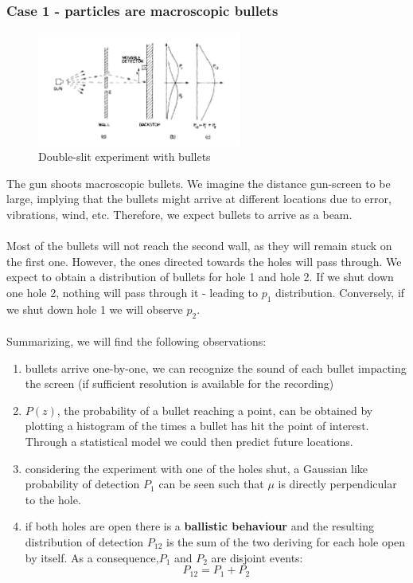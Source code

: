   \subsubsection{Case 1 - particles are macroscopic bullets}
  \begin{figure}[h!]
    \centering
    \includegraphics[clip, width=0.6\textwidth]{gun_ds.png}
    \caption{\label{fig:gun_ds} Double-slit experiment with bullets}
\end{figure}
  \noindent
  The gun shoots macroscopic bullets. We imagine the distance gun-screen to be large, implying that the bullets might arrive at different locations due to error, vibrations, wind, etc. Therefore, we expect bullets to arrive as a beam.\\
  \\
\noindent
  Most of the bullets will not reach the second wall, as they will remain stuck on the first one. However, the ones directed towards the holes will pass through. We expect to obtain a distribution of bullets for hole 1 and hole 2. If we shut down one hole 2, nothing will pass through it - leading to $p_1$ distribution. Conversely, if we shut down hole 1 we will observe $p_2$.\\
  \\
 \noindent
Summarizing, we will find the following observations:
\begin{enumerate}
    \item bullets arrive one-by-one, we can recognize the sound of each bullet impacting the screen (if sufficient resolution is available for the recording)
    \item $P(z)$, the probability of a bullet reaching a point, can be obtained by plotting a histogram of the times a bullet has hit the point of interest. Through a statistical model we could then predict future locations. 
     \item considering the experiment with one of the holes shut, a Gaussian like probability of detection $P_1$ can be seen such that $\mu$ is directly perpendicular to the hole.
     \item if both holes are open there is a \textbf{ballistic behaviour} and the resulting distribution of detection $P_{12}$ is the sum of the two deriving for each hole open by itself. As a consequence,$P_1$ and $P_2$ are disjoint events: $$P_{12} = P_1+P_2$$ 
\end{enumerate}
    
